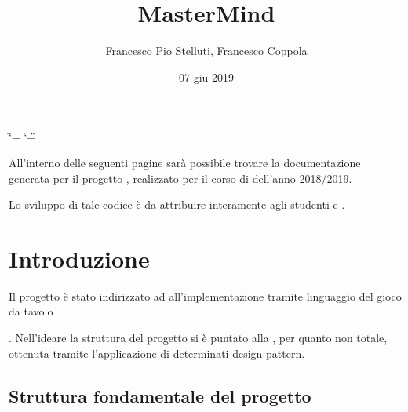\documentclass[letterpaper,10pt,italian,openany,oneside]{sphinxmanual}
\title{MasterMind}
\date{07 giu 2019}
\author{Francesco Pio Stelluti, Francesco Coppola}
\begin{document}
\ifdefined\shorthandoff
  \ifnum\catcode`\=\string=\active\shorthandoff{=}\fi
  \ifnum\catcode`\"=\active{}\fi
\fi

\pagestyle{empty}
\sphinxmaketitle
\pagestyle{plain}
\sphinxtableofcontents
\pagestyle{normal}
\label{\detokenize{index::doc}}

\begin{quote}

\begin{quote}

\begin{footnote}[1]\sphinxAtStartFootnote
{}
%
\end{footnote}
\end{quote}
\end{quote}

All’interno delle seguenti pagine sarà possibile trovare la documentazione
generata per il progetto , realizzato per il corso di 
dell’anno 2018/2019.

Lo sviluppo di tale codice è da attribuire interamente agli studenti  e .


\chapter{Introduzione}
\label{\detokenize{introduzione:introduzione}}\label{\detokenize{introduzione::doc}}
Il progetto è stato indirizzato ad all’implementazione tramite linguaggio 
del gioco da tavolo  %
\begin{footnote}[1]\sphinxAtStartFootnote
{}
%
\end{footnote}. Nell’ideare la struttura del progetto si è puntato
alla , per quanto non totale, ottenuta tramite l’applicazione
di determinati design pattern.


\section{Struttura fondamentale del progetto}
\label{\detokenize{introduzione:struttura-fondamentale-del-progetto}}
\noindent{}
\end{document}
